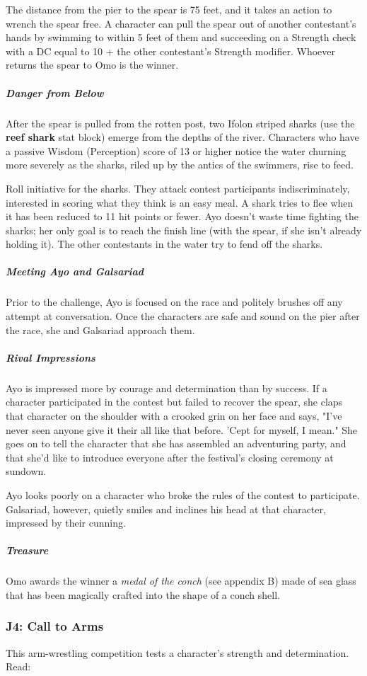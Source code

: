 \documentclass[10pt,a4paper,twoside,fancy,bg=print,twocolumn,openany,nodeprecatedcode]{dndbook}
\begin{document}
The distance from the pier to the spear is 75 feet, and it takes an action to wrench the spear free. A character can pull the spear out of another contestant's hands by swimming to within 5 feet of them and succeeding on a Strength check with a DC equal to 10 + the other contestant's Strength modifier. Whoever returns the spear to Omo is the winner.

\subparagraph{Danger from Below}
After the spear is pulled from the rotten post, two Ifolon striped sharks (use the \textbf{reef shark} stat block) emerge from the depths of the river. Characters who have a passive Wisdom (Perception) score of 13 or higher notice the water churning more severely as the sharks, riled up by the antics of the swimmers, rise to feed.

Roll initiative for the sharks. They attack contest participants indiscriminately, interested in scoring what they think is an easy meal. A shark tries to flee when it has been reduced to 11 hit points or fewer. Ayo doesn't waste time fighting the sharks; her only goal is to reach the finish line (with the spear, if she isn't already holding it). The other contestants in the water try to fend off the sharks.

\subparagraph{Meeting Ayo and Galsariad}
Prior to the challenge, Ayo is focused on the race and politely brushes off any attempt at conversation. Once the characters are safe and sound on the pier after the race, she and Galsariad approach them.

\subparagraph{Rival Impressions}
Ayo is impressed more by courage and determination than by success. If a character participated in the contest but failed to recover the spear, she claps that character on the shoulder with a crooked grin on her face and says, "I've never seen anyone give it their all like that before. 'Cept for myself, I mean." She goes on to tell the character that she has assembled an adventuring party, and that she'd like to introduce everyone after the festival's closing ceremony at sundown.

Ayo looks poorly on a character who broke the rules of the contest to participate. Galsariad, however, quietly smiles and inclines his head at that character, impressed by their cunning.

\subparagraph{Treasure}
Omo awards the winner a \textit{medal of the conch} (see appendix B) made of sea glass that has been magically crafted into the shape of a conch shell.

\subsubsection{J4: Call to Arms}
This arm-wrestling competition tests a character's strength and determination. Read:
\end{document}

